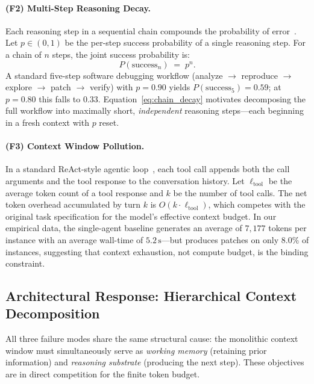 \documentclass[letterpaper]{aaai25}  %
\begin{document}
\paragraph{(F2) Multi-Step Reasoning Decay.}
Each reasoning step in a sequential chain compounds the probability of
error~\cite{valmeekam2023planning,huang2022inner}. Let $p \in (0,1)$ be the
per-step success probability of a single reasoning step. For a chain of $n$
steps, the joint success probability is:
\begin{equation}
  P(\text{success}_n) \;=\; p^n.
  \label{eq:chain_decay}
\end{equation}
A standard five-step software debugging workflow (analyze $\to$ reproduce
$\to$ explore $\to$ patch $\to$ verify) with $p = 0.90$ yields
$P(\text{success}_5) = 0.59$; at $p = 0.80$ this falls to $0.33$.
Equation~\eqref{eq:chain_decay} motivates decomposing the full workflow into
maximally short, \emph{independent} reasoning steps---each beginning in a
fresh context with $p$ reset.

\paragraph{(F3) Context Window Pollution.}
In a standard ReAct-style agentic loop~\cite{yao2023react}, each tool call
appends both the call arguments and the tool response to the conversation
history. Let $\ell_{\text{tool}}$ be the average token count of a tool
response and $k$ be the number of tool calls. The net token overhead
accumulated by turn $k$ is $O(k \cdot \ell_{\text{tool}})$, which
competes with the original task specification for the model's effective
context budget. In our empirical data, the single-agent baseline generates
an average of $7{,}177$ tokens per instance with an average wall-time of
$5.2\,\text{s}$---but produces patches on only $8.0\%$ of instances,
suggesting that context exhaustion, not compute budget, is the binding
constraint.

\subsection{Architectural Response: Hierarchical Context Decomposition}
\label{sec:intro:solution}

All three failure modes share the same structural cause: the monolithic
context window must simultaneously serve as \emph{working memory} (retaining
prior information) and \emph{reasoning substrate} (producing the next
step). These objectives are in direct competition for the finite token budget.
\end{document}
